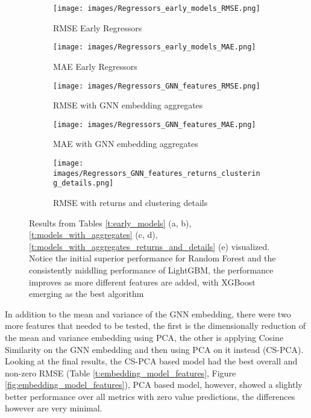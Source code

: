 \documentclass{article}
\begin{document}
\begin{figure}[H]
    \centering
    \begin{subfigure}[b]{0.45\textwidth}
        \texttt{[image: images/Regressors\_early\_models\_RMSE.png]}
        \caption{RMSE Early Regressors}
    \end{subfigure}
    \hfill
    \begin{subfigure}[b]{0.45\textwidth}
        \texttt{[image: images/Regressors\_early\_models\_MAE.png]}
        \caption{MAE Early Regressors}
    \end{subfigure}

    \vspace{0.5cm}
    \begin{subfigure}[b]{0.45\textwidth}
        \texttt{[image: images/Regressors\_GNN\_features\_RMSE.png]}
        \caption{RMSE with GNN embedding aggregates}
    \end{subfigure}
    \hfill
    \begin{subfigure}[b]{0.45\textwidth}
        \texttt{[image: images/Regressors\_GNN\_features\_MAE.png]}
        \caption{MAE with GNN embedding aggregates}
    \end{subfigure}

    \vspace{0.5cm}
    \begin{subfigure}[b]{0.45\textwidth}
        \texttt{[image: images/Regressors\_GNN\_features\_returns\_clustering\_details.png]}
        \caption{RMSE with returns and clustering details}
    \end{subfigure}
    \hfill
    
    \caption{Results from Tables \ref{t:early_models} (a, b), \ref{t:models_with_aggregates} (c, d), \ref{t:models_with_aggregates_returns_and_details} (e) visualized. Notice the initial superior performance for Random Forest and the consistently middling performance of LightGBM, the performance improves as more different features are added, with XGBoost emerging as the best algorithm}
    \label{fig:regressors_results_early}
\end{figure}

In addition to the mean and variance of the GNN embedding, there were two more features that needed to be tested, the first is the dimensionally reduction of the mean and variance embedding using PCA, the other is applying Cosine Similarity on the GNN embedding and then using PCA on it instead (CS-PCA). Looking at the final results, the CS-PCA based model had the best overall and non-zero RMSE (Table \ref{t:embedding_model_features}, Figure \ref{fig:embedding_model_features}), PCA based model, however, showed a slightly better performance over all metrics with zero value predictions, the differences however are very minimal.
\end{document}
